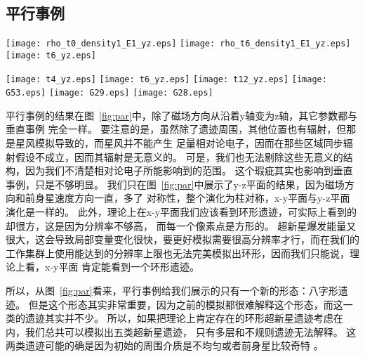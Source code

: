\subsection{平行事例}

\begin{figure*}
    \centering
    \texttt{[image: rho\_t0\_density1\_E1\_yz.eps]}
    \texttt{[image: rho\_t6\_density1\_E1\_yz.eps]}
    \texttt{[image: t6\_yz.eps]}
    \caption{平行事例的模拟结果。 左图是y-z平面的星风模拟结果加上遗迹爆发区域，也就是
    遗迹模拟的初始条件。中图是y-z平面的遗迹模拟结果。右图是从中图转化来的射电流量密度图。}
\label{fig:par}
\end{figure*}

\begin{figure*}
    \centering
    \texttt{[image: t4\_yz.eps]}
    \texttt{[image: t6\_yz.eps]}
    \texttt{[image: t12\_yz.eps]}\newline
    \texttt{[image: G53.eps]}
    \texttt{[image: G29.eps]}
    \texttt{[image: G28.eps]}
    \caption{上面三幅图是不同年龄的相对射电流量密度图。下面三幅图是实际观测到的与上图
    类似的实际观测到的八字形遗迹：G53.6-2.2、G29.7-0.3、G28.6-0.1\citep{West2016}。}
\label{fig:parc}
\end{figure*}

平行事例的结果在图~\ref{fig:par}中，除了磁场方向从沿着y轴变为z轴，其它参数都与垂直事例
完全一样。
要注意的是，虽然除了遗迹周围，其他位置也有辐射，但那是星风模拟导致的，而星风并不能产生
足量相对论电子，因而在那些区域同步辐射假设不成立，因而其辐射是无意义的。
可是，我们也无法剔除这些无意义的结构，因为我们不清楚相对论电子所能影响到的范围。
这个瑕疵其实也影响到垂直事例，只是不够明显。
我们只在图~\ref{fig:par}中展示了y-z平面的结果，因为磁场方向和前身星速度方向一直，多了
对称性，整个演化为柱对称，x-y平面与y-z平面演化是一样的。
此外，理论上在x-y平面我们应该看到环形遗迹，可实际上看到的却很方，这是因为分辨率不够高，
而每一个像素点是方形的。
超新星爆发能量又很大，这会导致局部变量变化很快，要更好模拟需要很高分辨率才行，而在我们的
工作集群上使用能达到的分辨率上限也无法完美模拟出环形，因而我们只能说，理论上看，x-y平面
肯定能看到一个环形遗迹。

所以，从图~\ref{fig:par}看来，平行事例给我们展示的只有一个新的形态：八字形遗迹。
但是这个形态其实非常重要，因为之前的模拟都很难解释这个形态，而这一类的遗迹其实并不少。
所以，如果把理论上肯定存在的环形超新星遗迹考虑在内，我们总共可以模拟出五类超新星遗迹，
只有多层和不规则遗迹无法解释。
这两类遗迹可能的确是因为初始的周围介质是不均匀或者前身星比较奇特
\citep{Orlando2007,Orlando2017}。

